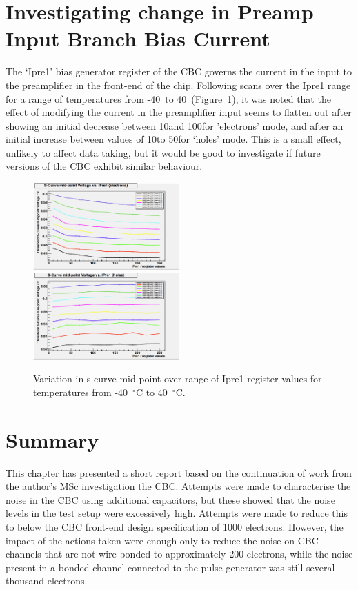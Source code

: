 \section{Investigating change in Preamp Input Branch Bias Current}
\label{s:investigating_change_in_preamp_input_branch_bias_current}
The `Ipre1' bias generator register of the CBC governs the current in the input to the preamplifier in the
front-end of the chip. Following scans over the Ipre1 range for a range of temperatures from
-40~\degreeCelsius to 40~\degreeCelsius (Figure~\ref{fig:midpoint_v_ipre1}), it was noted that the effect of
modifying the current in the preamplifier input seems to flatten out after showing an initial decrease between
10\uA and 100\uA for 'electrons' mode, and after an initial increase between values of 10\uA to 50\uA for
`holes' mode. This is a small effect, unlikely to affect data taking, but it would be good to investigate if
future versions of the CBC exhibit similar behaviour.

\begin{figure}[hbtp]
   \centering
     \includegraphics[width=0.5\textwidth]{Chapters/07_Appendices/07c_2_Images/scurve_midpoint_v_ipre1_electrons}\hfill
     \includegraphics[width=0.5\textwidth]{Chapters/07_Appendices/07c_2_Images/scurve_midpoint_v_ipre1_holes}
     \caption{Variation in s-curve mid-point over range of Ipre1 register values for temperatures from
     -40~$^{\circ}$C to 40~$^{\circ}$C.}
     \label{fig:midpoint_v_ipre1}
\end{figure}

\section{Summary}
\label{s:summary}
This chapter has presented a short report based on the continuation of work from the author's MSc
investigation the CBC. Attempts were made to characterise the noise in the CBC using additional capacitors,
but these showed that the noise levels in the test setup were excessively high. Attempts were made to reduce
this to below the CBC front-end design specification of 1000 electrons. However, the impact of the actions
taken were enough only to reduce the noise on CBC channels that are not wire-bonded to approximately 200
electrons, while the noise present in a bonded channel connected to the pulse generator was still several
thousand electrons.

